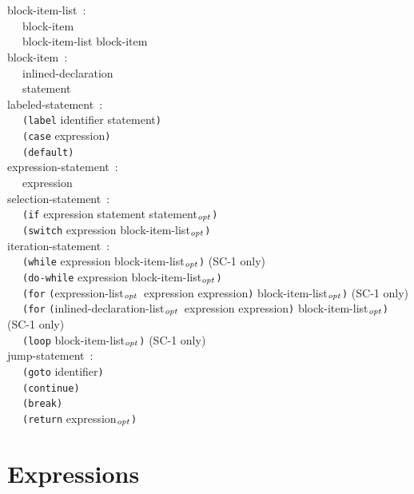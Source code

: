 \documentclass[a4]{article}
\def\|{\verb|} %|
\newcommand{\opt}{$_{{\it opt}}$}
\newcommand{\scoo}{{\rm \hfill (SC-1 only)}}
\begin{document}
\noindent
block-item-list{\rm \ :} \\
\|  | block-item \\
\|  | block-item-list block-item \\

\noindent
block-item{\rm \ :} \\
\|  | inlined-declaration \\
\|  | statement \\

\noindent
labeled-statement{\rm \ :} \\
\|  | {\tt (label} identifier statement{\tt )} \\
\|  | {\tt (case} expression{\tt )} \\
\|  | {\tt (default)} \\

\noindent
expression-statement{\rm \ :} \\
\|  | expression \\

\noindent
selection-statement{\rm \ :} \\
\|  | {\tt (if} expression statement statement\opt{\tt )} \\
\|  | {\tt (switch} expression block-item-list\opt{\tt )} \\

\noindent
iteration-statement{\rm \ :} \\
\|  | {\tt (while} expression block-item-list\opt{\tt )} \scoo \\
\|  | {\tt (do-while} expression block-item-list\opt{\tt )} \\
\|  | {\tt (for} {\tt (}expression-list\opt\ expression expression{\tt )} block-item-list\opt{\tt )} \scoo \\
\|  | {\tt (for} {\tt (}inlined-declaration-list\opt\ expression expression{\tt )} block-item-list\opt{\tt )} \scoo \\
\|  | {\tt (loop} block-item-list\opt{\tt )} \scoo \\

\noindent
jump-statement{\rm \ :} \\
\|  | {\tt (goto} identifier{\tt )} \\
\|  | {\tt (continue)} \\
\|  | {\tt (break)} \\
\|  | {\tt (return} expression\opt{\tt )} \\
\rm
\section{Expressions}
\it
\end{document}
